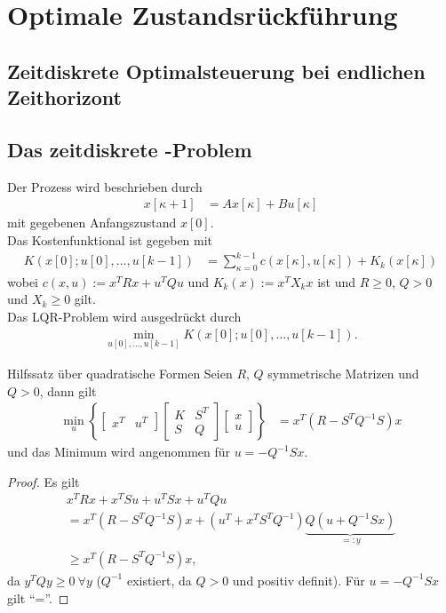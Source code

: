 \chapter{Optimale Zustandsrückführung}
\section{Zeitdiskrete Optimalsteuerung bei endlichen Zeithorizont}


\section{Das zeitdiskrete -Problem}
Der Prozess wird beschrieben durch
\begin{align}
	x[\kappa + 1] & = Ax[\kappa] + B u[\kappa]
\end{align}
mit gegebenen Anfangszustand $x[0]$.\\
Das Kostenfunktional ist gegeben mit
\begin{align}
	K\left(x[0];u[0],\ldots,u[k-1] \right) & = \sum\limits_{\kappa=0}^{k-1}c\left(x[\kappa],u[\kappa] \right) + K_k(x[\kappa])
\end{align}
wobei $c(x,u):=x^TRx + u^TQu$ und $K_k(x):=x^TX_kx$ ist und $R\geq0$, $Q>0$ und $X_k\geq 0$ gilt.\\
Das \ac{LQR}-Problem wird ausgedrückt durch
\begin{align}
	\min\limits_{u[0],\ldots,u[k-1]}K\left(x[0];u[0],\ldots,u[k-1] \right).
\end{align}
\begin{satz}{Hilfssatz über quadratische Formen}\label{satz:kap_3_quad_form}
Seien $R$, $Q$ symmetrische Matrizen und $Q>0$, dann gilt
\begin{align}
	\min\limits_u\left\{\begin{bmatrix}
	x^T	& u^T
	\end{bmatrix}\begin{bmatrix}
	K	&	S^T\\ S	&	Q
	\end{bmatrix}\begin{bmatrix}
	x\\ u
	\end{bmatrix} \right\} & = x^T\left(R-S^TQ^{-1}S \right)x
\end{align}
und das Minimum wird angenommen für $u=-Q^{-1}Sx$.
\end{satz}
\begin{proof}
Es gilt 
\begin{multline} %
	x^TRx + x^TS u + u^TS x + u^TQ u\\ 
	= x^T\left(R-S^TQ^{-1}S \right)x + \left(u^T + x^TS^TQ^{-1} \right)\underbrace{Q\left(u + Q^{-1}Sx \right) }_{=:y}\\
	\geq x^T \left(R-S^TQ^{-1}S \right)x,
\end{multline}
da $y^TQy\geq 0\ \forall y$ ($Q^{-1}$ existiert, da $Q>0$ und positiv definit). Für $u=-Q^{-1}Sx$ gilt "`="'.
\end{proof}
